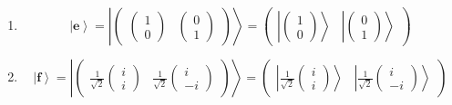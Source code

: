 \documentclass[aps,preprint]{revtex4}
\begin{document}
\begin{enumerate}
\item 
\begin{equation}
\left\vert \boldsymbol{e}\right\rangle =\left\vert \left( 
\begin{array}{cc}
\left( 
\begin{array}{c}
1 \\ 
0%
\end{array}%
\right) & \left( 
\begin{array}{c}
0 \\ 
1%
\end{array}%
\right)%
\end{array}%
\right) \right\rangle =\left( 
\begin{array}{cc}
\left\vert \left( 
\begin{array}{c}
1 \\ 
0%
\end{array}%
\right) \right\rangle & \left\vert \left( 
\begin{array}{c}
0 \\ 
1%
\end{array}%
\right) \right\rangle%
\end{array}%
\right)
\end{equation}

\item 
\begin{equation}
\left\vert \boldsymbol{f}\right\rangle =\left\vert \left( 
\begin{array}{cc}
\frac{1}{\sqrt{2}}\left( 
\begin{array}{c}
i \\ 
i%
\end{array}%
\right) & \frac{1}{\sqrt{2}}\left( 
\begin{array}{c}
i \\ 
-i%
\end{array}%
\right)%
\end{array}%
\right) \right\rangle =\left( 
\begin{array}{cc}
\left\vert \frac{1}{\sqrt{2}}\left( 
\begin{array}{c}
i \\ 
i%
\end{array}%
\right) \right\rangle & \left\vert \frac{1}{\sqrt{2}}\left( 
\begin{array}{c}
i \\ 
-i%
\end{array}%
\right) \right\rangle%
\end{array}%
\right)
\end{equation}


\end{enumerate}
\end{document}
